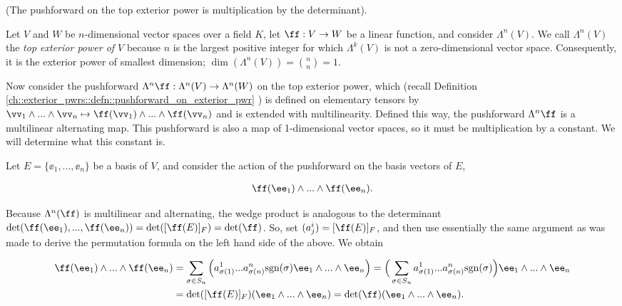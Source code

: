 \begin{theorem}
\label{ch::exterior_pwrs::rmk::top_pushforward_det}
    (The pushforward on the top exterior power is multiplication by the determinant).
    
    Let $V$ and $W$ be $n$-dimensional vector spaces over a field $K$, let $\ff:V \rightarrow W$ be a linear function, and consider $\Lambda^n(V)$. We call $\Lambda^n(V)$ the \textit{top exterior power of $V$} because $n$ is the largest positive integer for which $\Lambda^k(V)$ is not a zero-dimensional vector space. Consequently, it is the exterior power of smallest dimension; $\dim(\Lambda^n(V)) = \binom{n}{n} = 1$.
    
    Now consider the pushforward $\Lambda^n \ff: \Lambda^n(V) \rightarrow \Lambda^n(W)$ on the top exterior power, which (recall Definition \ref{ch::exterior_pwrs::defn::pushforward_on_exterior_pwr}
) is defined on elementary tensors by $\vv_1 \wedge ... \wedge \vv_n \mapsto \ff(\vv_1) \wedge ... \wedge \ff(\vv_n)$ and is extended with multilinearity. Defined this way, the pushforward $\Lambda^n \ff$ is a multilinear alternating map. This pushforward is also a map of 1-dimensional vector spaces, so it must be multiplication by a constant. We will determine what this constant is.
    
    Let $E = \{\ee_1, ..., \ee_n\}$ be a basis of $V$, and consider the action of the pushforward on the basis vectors of $E$,
    
    \begin{align*}
        \ff(\ee_1) \wedge ... \wedge \ff(\ee_n).
    \end{align*}
    
    Because $\Lambda^n(\ff)$ is multilinear and alternating, the wedge product is analogous to the determinant $\det(\ff(\ee_1), ..., \ff(\ee_n)) = \det([\ff(E)]_F) = \det(\ff)$. So, set $(a^i_j) = [\ff(E)]_F$, and then use essentially the same argument as was made to derive the permutation formula on the left hand side of the above. We obtain
    
    \begin{align*}
        \ff(\ee_1) \wedge ... \wedge 
        \ff(\ee_n) 
        &= \sum_{\sigma \in S_n} \Big( a^1_{\sigma(1)} ... a^n_{\sigma(n)} \sgn(\sigma) \ee_1 \wedge ... \wedge \ee_n \Big)
        = \Big( \sum_{\sigma \in S_n} a^1_{\sigma(1)} ... a^n_{\sigma(n)} \sgn(\sigma) \Big) \ee_1 \wedge ... \wedge \ee_n \\
        &= \det([\ff(E)]_F) (\ee_1 \wedge ... \wedge \ee_n)
        = \det(\ff) (\ee_1 \wedge ... \wedge \ee_n).
    \end{align*}
    

\end{theorem}
